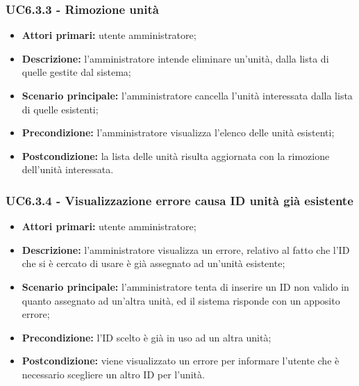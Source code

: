 \subsubsection{UC6.3.3 - Rimozione unità}
	\begin{itemize}
		\item \textbf{Attori primari:} utente amministratore;
		\item \textbf{Descrizione:} l'amministratore intende eliminare un'unità, dalla lista di quelle gestite dal sistema;
		\item \textbf{Scenario principale:} l'amministratore cancella l'unità interessata dalla lista di quelle esistenti;
		\item \textbf{Precondizione:} l'amministratore visualizza l'elenco delle unità esistenti;
		\item \textbf{Postcondizione:} la lista delle unità risulta aggiornata con la rimozione dell'unità interessata.
	\end{itemize}

\subsubsection{UC6.3.4 - Visualizzazione errore causa ID unità già esistente}
	\begin{itemize}
		\item \textbf{Attori primari:} utente amministratore;
		\item \textbf{Descrizione:} l'amministratore visualizza un errore, relativo al fatto che l'ID che si è cercato di usare è già assegnato ad un'unità esistente;
		\item \textbf{Scenario principale:} l'amministratore tenta di inserire un ID non valido in quanto assegnato ad un'altra unità, ed il sistema risponde con un apposito errore;
		\item \textbf{Precondizione:} l'ID scelto è già in uso ad un altra unità;
		\item \textbf{Postcondizione:} viene visualizzato un errore per informare l'utente che è necessario scegliere un altro ID per l'unità.
	\end{itemize}